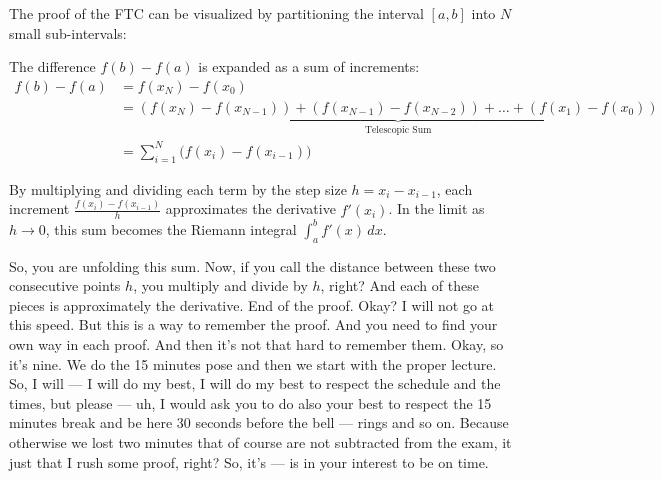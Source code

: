 \begin{math-stroke}
The proof of the FTC can be visualized by partitioning the interval $[a, b]$ into $N$ small sub-intervals:
\begin{center}
\end{center}
The difference $f(b) - f(a)$ is expanded as a sum of increments:
\begin{align*}
f(b) - f(a) &= f(x_N) - f(x_0) \\
&= \underbrace{(f(x_N) - f(x_{N-1})) + (f(x_{N-1}) - f(x_{N-2})) + \dots + (f(x_1) - f(x_0))}_{\text{Telescopic Sum}} \\
&= \sum_{i=1}^N \big( f(x_i) - f(x_{i-1}) \big)
\end{align*}
\begin{explanation-of-steps}
By multiplying and dividing each term by the step size $h = x_i - x_{i-1}$, each increment $\frac{f(x_i) - f(x_{i-1})}{h}$ approximates the derivative $f'(x_i)$. In the limit as $h \to 0$, this sum becomes the Riemann integral $\int_a^b f'(x) \, dx$.
\end{explanation-of-steps}
\end{math-stroke}

\begin{spoken-clean}[00:15:18 - 00:17:15]
So, you are unfolding this sum. Now, if you call the distance between these two consecutive points $h$, you multiply and divide by $h$, right? And each of these pieces is approximately the derivative. End of the proof. Okay? I will not go at this speed. But this is a way to remember the proof. And you need to find your own way in each proof. And then it's not that hard to remember them. Okay, so it's nine. We do the 15 minutes pose and then we start with the proper lecture.  So, I will --- I will do my best, I will do my best to respect the schedule and the times, but please --- uh, I would ask you to do also your best to respect the 15 minutes break and be here 30 seconds before the bell --- rings and so on. Because otherwise we lost two minutes that of course are not subtracted from the exam, it just that I rush some proof, right? So, it's --- is in your interest to be on time.
\end{spoken-clean}

